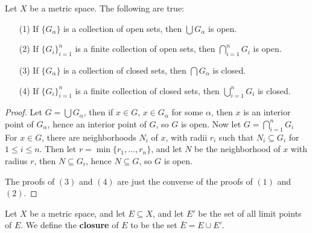 \begin{theorem}\label{2.2.6}
    Let $X$ be a metric space. The following are true:
        \begin{enumerate}
            \item[(1)] If $\{G_{\alpha}\}$ is a collection of  open sets, then $\bigcup{G_{\alpha}}$ is open.

            \item[(2)] If $\{G_i\}_{i=1}^n$ is a finite collection of open sets, then  $\bigcap_{i=1}^{n}{G_i}$ is open.

            \item[(3)] If $\{G_{\alpha}\}$ is a collection of  closed sets, then $\bigcap{G_{\alpha}}$ is closed.

            \item[(4)] If $\{G_i\}_{i=1}^n$ is a finite collection of closed sets, then  $\bigcup_{i=1}^{n}{G_i}$ is closed.
        \end{enumerate}
\end{theorem}
\begin{proof}
    Let $G=\bigcup{G_{\alpha}}$, then if $x \in G$,  $x \in G_{\alpha}$ for some $\alpha$, then
    $x$ is an interior point of  $G_{\alpha}$, hence an interior point of  $G$, so  $G$ is open.
    Now let  $G=\bigcap_{i=1}^{n}{G_i}$ For  $x \in G$, there are neighborhoods  $N_i$ of  $x$, with
    radii  $r_i$ such that  $N_i \subseteq G_i$ for  $1 \leq i \leq n$. Then let  $r=\min\{r_1, \dots, r_n\}$,
    and let $N$ be the neighborhood of  $x$ with radius  $r$, then  $N \subseteq G_i$,
    hence  $N \subseteq G$, so  $G$ is open.

    The proofs of  $(3)$ and  $(4)$ are just the converse of the proofs of  $(1)$ and  $(2)$.
\end{proof}

\begin{definition}
    Let $X$ be a metric space, and let  $E \subseteq X$, and let  $E'$ be the set of all
    limit points of $E$. We define the \textbf{closure} of $E$ to be the set $\bar{E}=E \cup E'$.
\end{definition}

